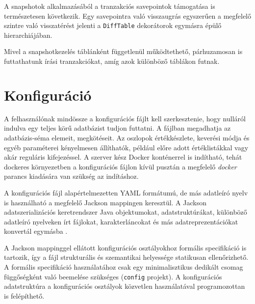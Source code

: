 \documentclass[
    parspace,
    noindent,
    nohyp,
]{elteiktdk}[2023/04/10]
\begin{document}
A snapshotok alkalmazásából a tranzakciós savepointok támogatása is természetesen következik.
Egy savepointra való visszaugrás egyszerűen a megfelelő szintre való visszatérést jelenti
a \texttt{DiffTable} dekorátorok egymásra épülő hierarchiájában.

Mivel a snapshotkezelés táblánként függetlenül működtethető,
párhuzamosan is futtathatunk írási tranzakciókat,
amíg azok különböző táblákon futnak.


\section{Konfiguráció}

A felhasználónak mindössze a konfigurációs fájlt kell szerkesztenie,
hogy nulláról indulva egy teljes körű adatbázist tudjon futtatni.
A fájlban megadhatja az adatbázis-séma elemeit, megkötéseit.
Az oszlopok értékkészlete, keverési módja és egyéb paraméterei kényelmesen állíthatók,
például előre adott értéklistákkal vagy akár reguláris kifejezéssel.
A szerver kész Docker konténerrel is indítható,
tehát dockeres környezetben a konfigurációs fájlon kívül
pusztán a megfelelő \textit{docker} parancs kiadására van szükség az indításhoz.

A konfigurációs fájl alapértelmezetten YAML formátumú,
de más adatleíró nyelv is használható
a megfelelő Jackson mappingen keresztül.
A Jackson adatszerializációs keretrendszer Java objektumokat, adatstruktúrákat,
különböző adatleíró nyelveken írt fájlokat, karakterláncokat
és más adatreprezentációkat konvertál egymásba%
\cite{SoftwareJackson}.

A Jackson mappinggel ellátott konfigurációs osztályokhoz formális specifikáció is tartozik,
így a fájl strukturális és szemantikai helyessége statikusan ellenőrizhető.
A formális specifikáció használatához csak egy minimalisztikus dedikált csomag
függőségként való beemelése szükséges (\texttt{config} projekt).
A konfigurációs adatstruktúra a konfigurációs osztályok közvetlen használatával programozottan is felépíthető.
\end{document}
